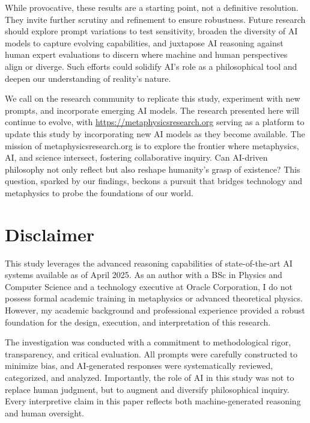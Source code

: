 \documentclass[11pt]{article}
\begin{document}
While provocative, these results are a starting point, not a definitive resolution. They invite further scrutiny and refinement to ensure robustness. Future research should explore prompt variations to test sensitivity, broaden the diversity of AI models to capture evolving capabilities, and juxtapose AI reasoning against human expert evaluations to discern where machine and human perspectives align or diverge. Such efforts could solidify AI’s role as a philosophical tool and deepen our understanding of reality’s nature.

We call on the research community to replicate this study, experiment with new prompts, and incorporate emerging AI models. The research presented here will continue to evolve, with \url{https://metaphysicsresearch.org} serving as a platform to update this study by incorporating new AI models as they become available. The mission of metaphysicsresearch.org is to explore the frontier where metaphysics, AI, and science intersect, fostering collaborative inquiry. Can AI-driven philosophy not only reflect but also reshape humanity’s grasp of existence? This question, sparked by our findings, beckons a pursuit that bridges technology and metaphysics to probe the foundations of our world.

\section*{Disclaimer}
This study leverages the advanced reasoning capabilities of state-of-the-art AI systems available as of April 2025. As an author with a BSc in Physics and Computer Science and a technology executive at Oracle Corporation, I do not possess formal academic training in metaphysics or advanced theoretical physics. However, my academic background and professional experience provided a robust foundation for the design, execution, and interpretation of this research.

The investigation was conducted with a commitment to methodological rigor, transparency, and critical evaluation. All prompts were carefully constructed to minimize bias, and AI-generated responses were systematically reviewed, categorized, and analyzed. Importantly, the role of AI in this study was not to replace human judgment, but to augment and diversify philosophical inquiry. Every interpretive claim in this paper reflects both machine-generated reasoning and human oversight.
\end{document}
